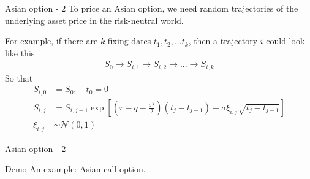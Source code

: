 \documentclass{beamer}
\begin{document}
\begin{frame}{Asian option - 2}
\justify
To price an Asian option, we need random trajectories of the underlying asset price in the risk-neutral world.

\justify
For example, if there are $k$ fixing dates $t_1, t_2, ... t_k$, then a trajectory $i$ could look like this 
\begin{align*}
S_0 \to S_{i,1} \to S_{i,2} \to ... \to S_{i,k}
\end{align*}
So that
\begin{align*}
S_{i,0} &= S_0, \quad t_0 = 0 \\
S_{i,j} &= S_{i,j-1} \exp\left[\left(r - q - \frac{\sigma^2}{2}\right)(t_j - t_{j-1}) + \sigma\xi_{i,j}\sqrt{t_j - t_{j-1}}\right] \\
\xi_{i,j} &\sim \mathcal{N}(0, 1)
\end{align*}
\end{frame}



\newcommand{\plotStockPath}[2] {
	
	\addplot[
		mark = *,
		color = #2,
		thick
	]
	table[
		x = t,
		y = stock_price,
		col sep = comma,
		discard if not={path}{#1}
	]
	{monte_carlo_paths.csv};
}

\begin{frame}{Asian option - 2}
\centering
{}
\end{frame}



\begin{frame}{Demo}
\justify
An example: Asian call option.
\end{frame}
\end{document}
